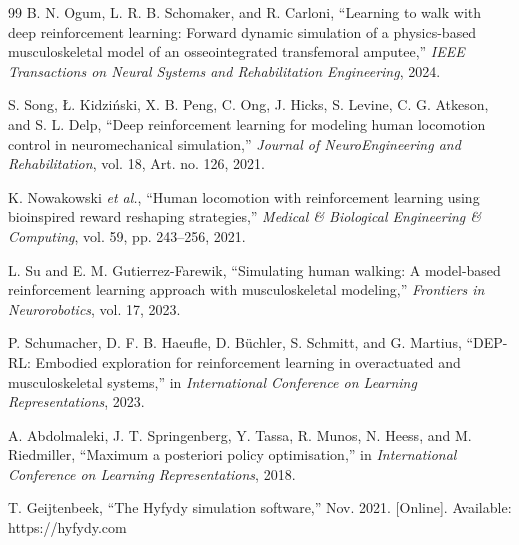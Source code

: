 \documentclass[acmtog,screen]{acmart}
\begin{document}
\begin{thebibliography}{99}
B. N. Ogum, L. R. B. Schomaker, and R. Carloni, ``Learning to walk with deep
reinforcement learning: Forward dynamic simulation of a physics-based
musculoskeletal model of an osseointegrated transfemoral amputee,''
\textit{IEEE Transactions on Neural Systems and Rehabilitation Engineering},
2024.

S. Song, {\L}. Kidzi{\'n}ski, X. B. Peng, C. Ong, J. Hicks, S. Levine,
C. G. Atkeson, and S. L. Delp, ``Deep reinforcement learning for modeling
human locomotion control in neuromechanical simulation,'' \textit{Journal of
NeuroEngineering and Rehabilitation}, vol. 18, Art. no. 126, 2021.

K. Nowakowski \textit{et al.}, ``Human locomotion with reinforcement learning
using bioinspired reward reshaping strategies,'' \textit{Medical \&
Biological Engineering \& Computing}, vol. 59, pp. 243--256, 2021.

L. Su and E. M. Gutierrez-Farewik, ``Simulating human walking: A model-based
reinforcement learning approach with musculoskeletal modeling,'' \textit{Frontiers
in Neurorobotics}, vol. 17, 2023.

P. Schumacher, D. F. B. Haeufle, D. B{\"u}chler, S. Schmitt, and G. Martius,
``DEP-RL: Embodied exploration for reinforcement learning in overactuated and
musculoskeletal systems,'' in \textit{International Conference on Learning
Representations}, 2023.

A. Abdolmaleki, J. T. Springenberg, Y. Tassa, R. Munos, N. Heess, and
M. Riedmiller, ``Maximum a posteriori policy optimisation,'' in
\textit{International Conference on Learning Representations}, 2018.

T. Geijtenbeek, ``The Hyfydy simulation software,'' Nov. 2021. [Online].
Available: https://hyfydy.com
\end{thebibliography}
\end{document}
